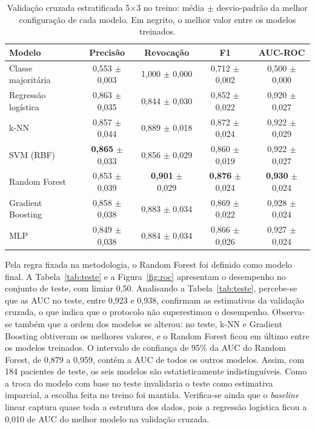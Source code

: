 \documentclass[12pt]{article}
\begin{document}
\begin{table}[!htb]
\centering
\caption{Validação cruzada estratificada 5$\times$3 no treino: média $\pm$
desvio-padrão da melhor configuração de cada modelo. Em negrito, o melhor valor
entre os modelos treinados.}
\label{tab:cv}
\footnotesize
\begin{tabular}{@{}lcccc@{}}
\toprule
Modelo & Precisão & Revocação & F1 & AUC-ROC \\
\midrule
Classe majoritária & 0,553 $\pm$ 0,003 & 1,000 $\pm$ 0,000 & 0,712 $\pm$ 0,002 & 0,500 $\pm$ 0,000 \\
Regressão logística & 0,863 $\pm$ 0,035 & 0,844 $\pm$ 0,030 & 0,852 $\pm$ 0,022 & 0,920 $\pm$ 0,027 \\
k-NN & 0,857 $\pm$ 0,044 & 0,889 $\pm$ 0,018 & 0,872 $\pm$ 0,024 & 0,922 $\pm$ 0,029 \\
SVM (RBF) & \textbf{0,865} $\pm$ 0,033 & 0,856 $\pm$ 0,029 & 0,860 $\pm$ 0,019 & 0,922 $\pm$ 0,027 \\
Random Forest & 0,853 $\pm$ 0,039 & \textbf{0,901} $\pm$ 0,029 & \textbf{0,876} $\pm$ 0,024 & \textbf{0,930} $\pm$ 0,024 \\
Gradient Boosting & 0,858 $\pm$ 0,038 & 0,883 $\pm$ 0,034 & 0,869 $\pm$ 0,022 & 0,928 $\pm$ 0,024 \\
MLP & 0,849 $\pm$ 0,038 & 0,884 $\pm$ 0,034 & 0,866 $\pm$ 0,026 & 0,927 $\pm$ 0,024 \\
\bottomrule
\end{tabular}
\end{table}

Pela regra fixada na metodologia, o Random Forest foi definido como modelo
final. A Tabela~\ref{tab:teste} e a Figura~\ref{fig:roc} apresentam o
desempenho no conjunto de teste, com limiar 0,50. Analisando a
Tabela~\ref{tab:teste}, percebe-se que as AUC no teste, entre 0,923 e 0,938,
confirmam as estimativas da validação cruzada, o que indica que o protocolo
não superestimou o desempenho. Observa-se também que a ordem dos modelos se
alterou: no teste, k-NN e Gradient Boosting obtiveram os melhores valores, e
o Random Forest ficou em último entre os modelos treinados. O intervalo de
confiança de 95\% da AUC do Random Forest, de 0,879 a 0,959, contém a AUC de
todos os outros modelos. Assim, com 184 pacientes de teste, os seis modelos
são estatisticamente indistinguíveis. Como a troca do modelo com base no
teste invalidaria o teste como estimativa imparcial, a escolha feita no
treino foi mantida. Verifica-se ainda que o \textit{baseline} linear captura
quase toda a estrutura dos dados, pois a regressão logística ficou a 0,010
de AUC do melhor modelo na validação cruzada.
\end{document}
